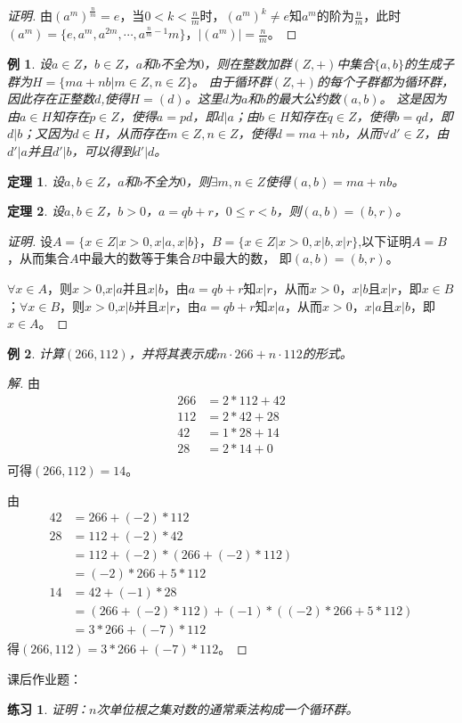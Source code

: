 \documentclass{article}
\newtheorem{Thm}{定理}
\newtheorem{Exercise}{练习}
\newtheorem*{Example}{例}
\begin{document}
\begin{CJK*}{UTF8}{gbsn}
\begin{proof}[证明]
  由$(a^m)^{\frac{n}{m}}=e$，当$0<k<\frac{n}{m}$时，$(a^m)^k\neq e$知$a^m$的阶为$\frac{n}{m}$，此时$(a^m)=\{e,a^m,a^{2m},\cdots,a^{\frac{n}{m}-1}m\}$，$|(a^m)|=\frac{n}{m}$。
\end{proof}
\begin{Example}
  设$a\in Z$，$b\in Z$，$a$和$b$不全为$0$，则在整数加群$(Z,+)$中集合$\{a,b\}$的生成子群为$H=\{ma+nb|m\in Z,n\in Z\}$。
  由于循环群$(Z,+)$的每个子群都为循环群，因此存在正整数$d$,使得$H=(d)$。这里$d$为$a$和$b$的最大公约数$(a,b)$。
  这是因为由$a\in H$知存在$p\in Z$，使得$a=pd$，即$d|a$；由$b\in H$知存在$q\in Z$，使得$b=qd$，即$d|b$；又因为$d\in H$，从而存在$m\in Z,n\in Z$，使得$d=ma+nb$，从而$\forall d'\in Z$，由$d'|a$并且$d'|b$，可以得到$d'|d$。
\end{Example}
\begin{Thm}
  设$a,b\in Z$，$a$和$b$不全为$0$，则$\exists m,n\in Z$使得$(a,b)=ma+nb$。
\end{Thm}
\begin{Thm}
  设$a,b\in Z$，$b>0$，$a=qb+r$，$0\leq r < b$，则$(a,b)=(b,r)$。
\end{Thm}
\begin{proof}[证明]
  设$A=\{x\in Z|x>0,x|a,x|b\}$，$B=\{x\in Z|x>0,x|b,x|r\}$,以下证明$A=B$，从而集合$A$中最大的数等于集合$B$中最大的数，
  即$(a,b)=(b,r)$。

  $\forall x\in A$，则$x>0$,$x|a$并且$x|b$，由$a=qb+r$知$x|r$，从而$x>0$，$x|b$且$x|r$，即$x\in B$；$\forall x\in B$，则$x>0$,$x|b$并且$x|r$，由$a=qb+r$知$x|a$，从而$x>0$，$x|a$且$x|b$，即$x\in A$。
\end{proof}
\begin{Example}
  计算$(266,112)$，并将其表示成$m\cdot 266 + n\cdot 112$的形式。
\end{Example}
\begin{proof}[解]
  由
  \begin{align*}
    266&=2*112+42\\
    112&=2*42+28\\
    42&=1*28+14\\
    28&=2*14+0\\
  \end{align*}
可得$(266,112)=14$。

由
\begin{align*}
  42&=266+(-2)*112\\
  28&=112+(-2)*42\\
  &=112+(-2)*(266+(-2)*112)\\
  &=(-2)*266+5*112\\
  14&=42+(-1)*28\\
  &=(266+(-2)*112)+(-1)*((-2)*266+5*112)\\
  &=3*266+(-7)*112
\end{align*}
得$(266,112)=3*266+(-7)*112$。
\end{proof}
课后作业题：
\begin{Exercise}
证明：$n$次单位根之集对数的通常乘法构成一个循环群。
\end{Exercise}


\end{CJK*}
\end{document}
